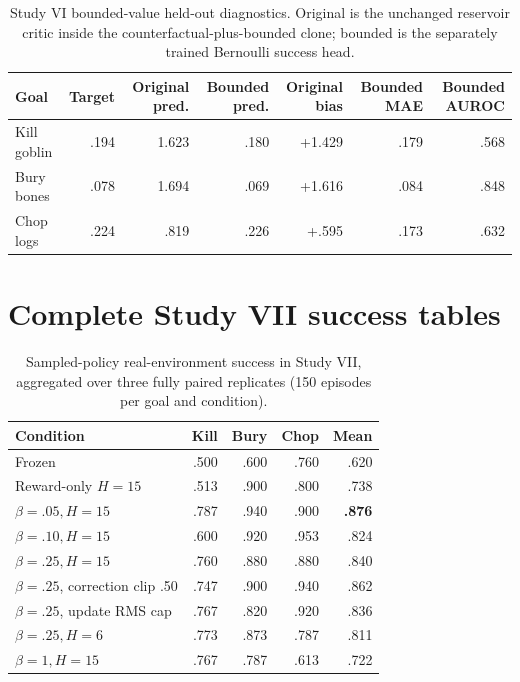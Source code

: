 \documentclass[10pt]{article}
\begin{document}
\begin{table}[H]
\centering
\small
\caption{Study VI bounded-value held-out diagnostics. Original is the unchanged reservoir critic inside the counterfactual-plus-bounded clone; bounded is the separately trained Bernoulli success head.}
\begin{tabular}{lrrrrrr}
\toprule
Goal & Target & Original pred. & Bounded pred. & Original bias & Bounded MAE & Bounded AUROC \\
\midrule
Kill goblin & .194 & 1.623 & .180 & +1.429 & .179 & .568 \\
Bury bones & .078 & 1.694 & .069 & +1.616 & .084 & .848 \\
Chop logs & .224 & .819 & .226 & +.595 & .173 & .632 \\
\bottomrule
\end{tabular}
\end{table}

\section{Complete Study VII success tables}

\begin{table}[H]
\centering
\small
\caption{Sampled-policy real-environment success in Study VII, aggregated over three fully paired replicates (150 episodes per goal and condition).}
\begin{tabular}{lrrrr}
\toprule
Condition & Kill & Bury & Chop & Mean \\
\midrule
Frozen & .500 & .600 & .760 & .620 \\
Reward-only $H=15$ & .513 & .900 & .800 & .738 \\
$\beta=.05,H=15$ & .787 & .940 & .900 & \textbf{.876} \\
$\beta=.10,H=15$ & .600 & .920 & .953 & .824 \\
$\beta=.25,H=15$ & .760 & .880 & .880 & .840 \\
$\beta=.25$, correction clip .50 & .747 & .900 & .940 & .862 \\
$\beta=.25$, update RMS cap & .767 & .820 & .920 & .836 \\
$\beta=.25,H=6$ & .773 & .873 & .787 & .811 \\
$\beta=1,H=15$ & .767 & .787 & .613 & .722 \\
\bottomrule
\end{tabular}
\end{table}
\end{document}
